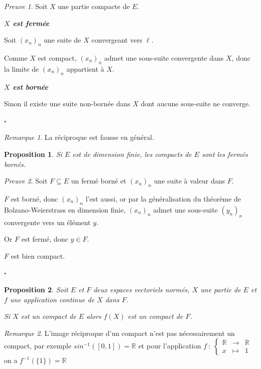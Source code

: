 \documentclass[]{article}
\newtheorem{myproposition}{Proposition}
\theoremstyle{remark}
\newtheorem{myrem}{Remarque}
\newtheorem{myproof}{Preuve}
\theoremstyle{definition}
\newcommand{\cqfd}{
	\hfill$\square$
}
\newcommand{\func}[5]{
#1 ~ : ~ \left\{ \begin{array}{lcl}
	#2 & \longrightarrow & #3 \\
	#4 & \longmapsto & #5
\end{array}
\right.
}
\newenvironment{proofpart}[1]{
	\leavevmode
	
	\noindent
	{\textit{\textbf{\boldmath #1}}}
	
}{
	\checkmark
}
\begin{document}
\begin{myproof}
	Soit $X$ une partie compacte de $E$.
	
	\begin{proofpart}{$X$ est fermée}
		Soit $(x_n)_n$ une suite de $X$ convergeant vers $\ell$.
		
		Comme $X$ est compact, $(x_n)_n$ admet une sous-suite convergente dans $X$, donc la limite de $(x_n)_n$ appartient à $X$.
	\end{proofpart}
	
	\begin{proofpart}{$X$ est bornée}
		Sinon il existe une suite non-bornée dans $X$ dont aucune sous-suite ne converge.
	\end{proofpart}
	
	\cqfd
\end{myproof}

\begin{myrem}
	La réciproque est fausse en général.
\end{myrem}

\begin{myproposition}
	Si $E$ est de dimension finie, les compacts de $E$ sont les fermés bornés.
\end{myproposition}

\begin{myproof}
	Soit $F \subseteq E$ un fermé borné et $(x_n)_n$ une suite à valeur dans $F$.
	
	$F$ est borné, donc $(x_n)_n$ l'est aussi, or par la généralisation du théorème de Bolzano-Weierstrass en dimension finie, $(x_n)_n$ admet une sous-suite $(y_n)_n$ convergente vers un élément $y$.
	
	Or $F$ est fermé, donc $y \in F$.
	
	$F$ est bien compact.
	
	\cqfd
\end{myproof}

\begin{myproposition}
	Soit $E$ et $F$ deux espaces vectoriels normés, $X$ une partie de $E$ et $f$ une application continue de $X$ dans $F$.
	
	Si $X$ est un compact de $E$ alors $f(X)$ est un compact de $F$.
\end{myproposition}

\begin{myrem}
	L'image réciproque d'un compact n'est pas nécessairement un compact, par exemple $sin^{-1}([0, 1])= \mathbb{R}$ et pour l'application $\func{f}{\mathbb{R}}{\mathbb{R}}{x}{1}$ on a  $f^{-1}(\{1\})=\mathbb{R}$
\end{myrem}
\end{document}
